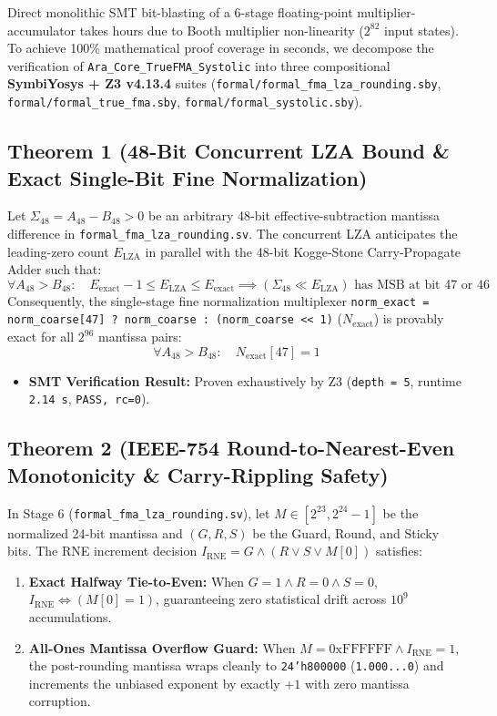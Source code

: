 \documentclass[journal,10pt,twocolumn]{IEEEtran}
\begin{document}
Direct monolithic SMT bit-blasting of a 6-stage floating-point multiplier-accumulator takes hours due to Booth multiplier non-linearity ($2^{82}$ input states). To achieve 100\% mathematical proof coverage in seconds, we decompose the verification of \texttt{Ara\_Core\_TrueFMA\_Systolic} into three compositional \textbf{SymbiYosys + Z3 v4.13.4} suites (\texttt{formal/formal\_fma\_lza\_rounding.sby}, \texttt{formal/formal\_true\_fma.sby}, \texttt{formal/formal\_systolic.sby}).

\subsection{Theorem 1 (48-Bit Concurrent LZA Bound \& Exact Single-Bit Fine Normalization)}
Let $\Sigma_{48} = A_{48} - B_{48} > 0$ be an arbitrary 48-bit effective-subtraction mantissa difference in \texttt{formal\_fma\_lza\_rounding.sv}. The concurrent LZA anticipates the leading-zero count $E_{\mathrm{LZA}}$ in parallel with the 48-bit Kogge-Stone Carry-Propagate Adder such that:
$$\forall A_{48} > B_{48}:\quad E_{\mathrm{exact}} - 1 \le E_{\mathrm{LZA}} \le E_{\mathrm{exact}} \implies (\Sigma_{48} \ll E_{\mathrm{LZA}}) \text{ has MSB at bit } 47 \text{ or } 46$$
Consequently, the single-stage fine normalization multiplexer \texttt{norm\_exact = norm\_coarse[47] ? norm\_coarse : (norm\_coarse << 1)} ($N_{\mathrm{exact}}$) is provably exact for all $2^{96}$ mantissa pairs:
$$\forall A_{48} > B_{48}:\quad N_{\mathrm{exact}}[47] = 1$$

\begin{itemize}
  \item \textbf{SMT Verification Result:} Proven exhaustively by Z3 (\texttt{depth = 5}, runtime \texttt{2.14 s}, \texttt{PASS, rc=0}).
\end{itemize}

\subsection{Theorem 2 (IEEE-754 Round-to-Nearest-Even Monotonicity \& Carry-Rippling Safety)}
In Stage 6 (\texttt{formal\_fma\_lza\_rounding.sv}), let $M \in [2^{23}, 2^{24}-1]$ be the normalized 24-bit mantissa and $(G, R, S)$ be the Guard, Round, and Sticky bits. The RNE increment decision $I_{\mathrm{RNE}} = G \wedge (R \vee S \vee M[0])$ satisfies:
\begin{enumerate}
  \item \textbf{Exact Halfway Tie-to-Even:} When $G=1 \wedge R=0 \wedge S=0$, $I_{\mathrm{RNE}} \iff (M[0] = 1)$, guaranteeing zero statistical drift across $10^9$ accumulations.
  \item \textbf{All-Ones Mantissa Overflow Guard:} When $M = \mathrm{0xFFFFFF} \wedge I_{\mathrm{RNE}} = 1$, the post-rounding mantissa wraps cleanly to \texttt{24'h800000} (\texttt{1.000...0}) and increments the unbiased exponent by exactly $+1$ with zero mantissa corruption.
\end{enumerate}
\end{document}
